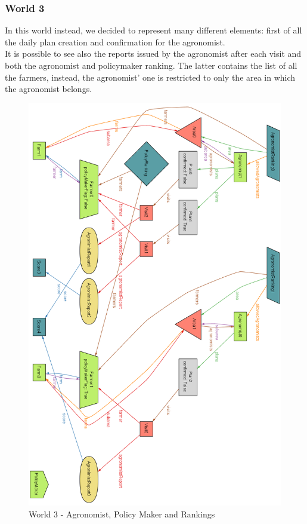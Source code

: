 \subsubsection{World 3}
In this world instead, we decided to represent many different elements: first of all the daily plan creation and confirmation for the agronomist.\\
It is possible to see also the reports issued by the agronomist after each visit and both the agronomist and policymaker ranking.
The latter contains the list of all the farmers, instead, the agronomist' one is restricted to only the area in which the agronomist belongs.
\begin{figure}[H]
\centering
\includegraphics[scale=0.4]{../AlloyCode/ExportWorldPNG/world3_agro_policymaker_reports_rankings.png}
\caption{\label{fig:alloyExecution}World 3 - Agronomist, Policy Maker and Rankings}
\end{figure}

